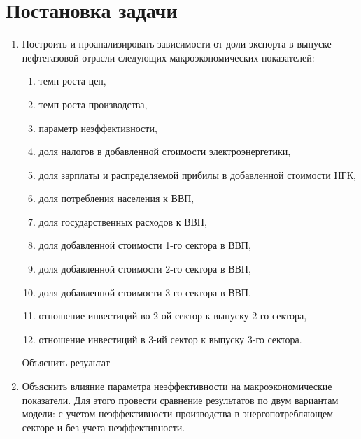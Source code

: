 \documentclass[12pt]{article}
\theoremstyle{rusdef}
\begin{document}
\section{Постановка задачи}
\begin{enumerate}
\item Построить и проанализировать зависимости от доли экспорта в выпуске нефтегазовой отрасли следующих макроэкономических показателей:
\begin{enumerate}
\item темп роста цен,
\item темп роста производства,
\item параметр неэффективности,
\item доля налогов в добавленной стоимости электроэнергетики,
\item доля зарплаты и распределяемой прибилы в добавленной стоимости НГК,
\item доля потребления населения к ВВП,
\item доля государственных расходов к ВВП,
\item доля добавленной стоимости 1-го сектора в ВВП,
\item доля добавленной стоимости 2-го сектора в ВВП,
\item доля добавленной стоимости 3-го сектора в ВВП,
\item отношение инвестиций во 2-ой сектор к выпуску 2-го сектора,
\item отношение инвестиций в 3-ий сектор к выпуску 3-го сектора.
\end{enumerate}
Объяснить результат
\item
Объяснить влияние параметра неэффективности на макроэкономические показатели. Для этого провести сравнение результатов по двум вариантам модели: с учетом неэффективности производства в энергопотребляющем секторе и без учета неэффективности.
\end{enumerate}
\end{document}

